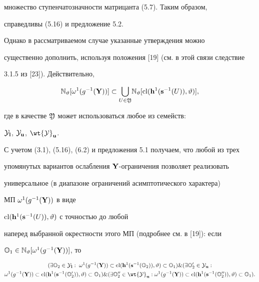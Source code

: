 множество ступенчатозначности матрицанта (5.7). Таким образом,


справедливы (5.16) и предложение 5.2.


Однако в рассматриваемом случае указанные утверждения можно


существенно дополнить, используя положения [19] (см. в этой связи следствие


3.1.5 из [23]). Действительно,


\begin{equation}


{{\Bbb N}_\vt}[{{\omega}^1}({g^{-1}}({\bold Y}))] \subset


{\bigcup\limits_{U \in


{\frak Y}}}{{\Bbb N}_\vt}[{\cl}({{\bold h}^1}({{\bold s}^{-1}}(U)),\vt)],


\end{equation}


где в качестве ${\frak Y}$ может использоваться любое из семейств:


${{\cal Y}_{\bold l}}$, ${{\cal Y}_{\bold u}}$, ${\wt {\cal Y}}_{\bold u}$.


С учетом (3.1), (5.16), (6.2) и предложения 5.1 получаем, что любой из трех


упомянутых вариантов ослабления ${\bold Y}$-ограничения позволяет реализовать


универсальное (в диапазоне ограничений асимптотического характера)


МП ${{\omega}^1}({g^{-1}}({\bold Y}))$ в виде


${\operatorname{cl}}({{\bold h}^1}({{\bold s}^{-1}}(U)),\vartheta)$ с точностью до любой


наперед выбранной окрестности этого МП (подробнее см. в [19]): если


${{\Bbb O}_1} \in {{\Bbb N}_\vartheta}[{{\omega}^1}({g^{-1}}({\bold Y}))]$, то


\begin{multline}


(\exi{{\Bbb O}_2} \in {{\cal Y}_{\bold


l}}:\;{{\omega}^1}({g^{-1}}({\bold Y})) \subset {\cl}({{\bold


h}^1}({{\bold s}^{-1}}({{\Bbb O}_2})),\vt) \subset {{\Bbb O}_1}) \&


(\exi{{\Bbb O}'_2} \in {{\cal Y}_{\bold u}}:\\ 


{}{{\omega}^1}({g^{-1}}({\bold Y})) \subset {\cl}({{\bold h}^{1}}({{\bold


s}^{-1}}({{\Bbb O}'_2})),\vt) \subset {{\Bbb O}_1}) \& (\exi{{\Bbb


O}''_2} \in {{\wt {\cal Y}}_{\bold u}}:


{}{{\omega}^1}({g^{-1}}({\bold Y})) \subset {\cl}({{\bold h}^1}({{\bold


s}^{-1}}({{\Bbb O}''_2})),\vt) \subset {{\Bbb O}_1}).


\end{multline}


